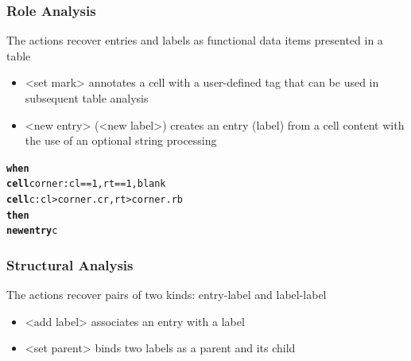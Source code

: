 \documentclass[10pt]{beamer}
\begin{document}
\begin{frame}[fragile]
\frametitle{Role Analysis}
The actions recover entries and labels as functional data items presented in a table
\begin{itemize}
	\item \alert{<set mark>} annotates a cell with a user-defined tag that can be used in subsequent table analysis
	\item \alert{<new entry>} (\alert{<new label>}) creates an entry (label) from a cell content with the use of an optional string processing
\end{itemize}
\footnotesize{
\begin{example}
\begin{alltt}
\textbf{when}
  \textbf{cell} corner: cl == 1, rt == 1, blank
  \textbf{cell} c: cl > corner.cr, rt > corner.rb
\textbf{then}
  \textbf{new entry} c
\end{alltt}
\end{example}
}
\end{frame}



\begin{frame}[fragile]
\frametitle{Structural Analysis}
The actions recover pairs of two kinds: entry-label and label-label
\begin{itemize}
	\item \alert{<add label>} associates an entry with a label
	\item \alert{<set parent>} binds two labels as a parent and its child
\end{itemize}
\footnotesize{
}
\end{frame}


\end{document}

